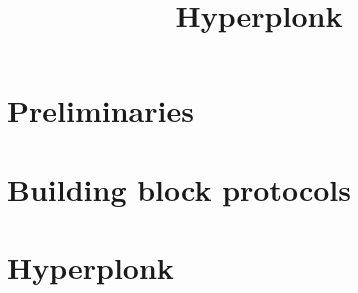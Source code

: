 \documentclass[a4paper,10pt]{llncs}
\title{Hyperplonk}
\author{}
\institute{}
\begin{document}
\setlength{\parskip}{0pt}

\maketitle


\section{Preliminaries}


\section{Building block protocols}


\section{Hyperplonk}
 

\clearpage


\end{document}
